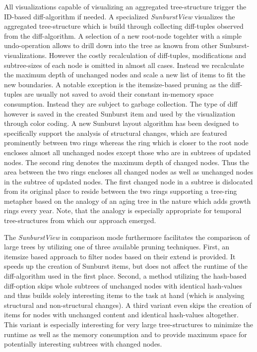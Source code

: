 All visualizations capable of visualizing an aggregated tree-structure trigger the ID-based diff-algorithm if needed. A specialized \emph{SunburstView} visualizes the aggregated tree-structure which is build through collecting diff-tuples observed from the diff-algorithm. A selection of a new root-node togehter with a simple undo-operation allows to drill down into the tree as known from other Sunburst-visualizations. However the costly recalculation of diff-tuples, modifications and subtree-sizes of each node is omitted in almost all cases. Instead we recalculate the maximum depth of unchanged nodes and scale a new list of items to fit the new boundaries. A notable exception is the itemsize-based pruning as the diff-tuples are usually not saved to avoid their constant in-memory space consumption. Instead they are subject to garbage collection. The type of diff however is saved in the created Sunburst item and used by the visualization through color coding. A new Sunburst layout algorithm has been designed to specifically support the analysis of structural changes, which are featured prominently between two rings whereas the ring which is closer to the root node encloses almost all unchanged nodes except those who are in subtrees of updated nodes. The second ring denotes the maximum depth of changed nodes. Thus the area between the two rings encloses all changed nodes as well as unchanged nodes in the subtree of updated nodes. The first changed node in a subtree is dislocated from its original place to reside between the two rings supporting a tree-ring metapher based on the analogy of an aging tree in the nature which adds growth rings every year. Note, that the analogy is especially appropriate for temporal tree-structures from which our approach emerged. 

The \emph{SunburstView} in comparison mode furthermore facilitates the comparison of large trees by utilizing one of three available pruning techniques. First, an itemsize based approach to filter nodes based on their extend is provided. It speeds up the creation of Sunburst items, but does not affect the runtime of the diff-algorithm used in the first place. Second, a method utilizing the hash-based diff-option skips whole subtrees of unchanged nodes with identical hash-values and thus builds solely interesting items to the task at hand (which is analysing structural and non-structural changes). A third variant even skips the creation of items for nodes with unchanged content and identical hash-values altogether. This variant is especially interesting for very large tree-structures to minimize the runtime as well as the memory consumption and to provide maximum space for potentially interesting subtrees with changed nodes.

